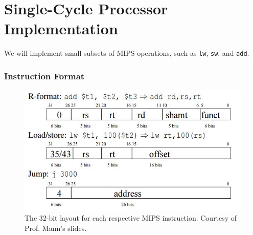 \documentclass{report}
\begin{document}
\section{Single-Cycle Processor Implementation}
We will implement small subsets of MIPS operations, such as \texttt{lw}, \texttt{sw}, and \texttt{add}.
\subsubsection{Instruction Format}
\begin{figure}[ht]
\begin{center}
\includegraphics[scale=0.5]{bitlayout.jpg}
\end{center}
\caption{The 32-bit layout for each respective MIPS instruction. Courtesy of Prof. Mann's slides.}
\end{figure}
\end{document}
